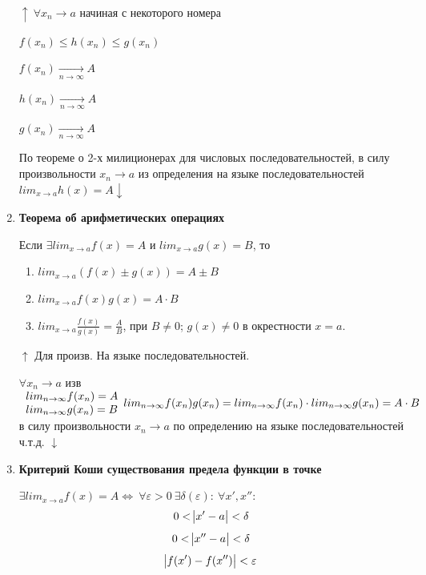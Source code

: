 \documentclass{article}
\begin{document}
\begin{enumerate}
    \(\uparrow\ \forall x_n \rightarrow a\) начиная с некоторого номера
    
    \( f(x_n) \leq h(x_n) \leq g(x_n) \)

    \( f(x_n) \xrightarrow[n \rightarrow \infty]{} A \)

    \( h(x_n) \xrightarrow[n \rightarrow \infty]{} A \)

    \( g(x_n) \xrightarrow[n \rightarrow \infty]{} A \)

    По теореме о 2-х милиционерах для числовых последовательностей, в силу произвольности \(x_n \rightarrow a\) из определения на языке последовательностей \(lim_{x \rightarrow a} h(x) = A \downarrow\)
    
    \item \textbf{Теорема об арифметических операциях}

      Если \(\exists lim_{x \rightarrow a} f(x)=A\) и \(lim_{x\rightarrow a} g(x) = B\), то
      \begin{enumerate}
        \item \(lim_{x \rightarrow a}(f(x)\pm g(x))=A\pm B\)
        \item \(lim_{x \rightarrow a} f(x)g(x) = A \cdot B\)
        \item \(lim_{x \rightarrow a} \frac{f(x)}{g(x)} = \frac{A}{B}\), при \(B \neq 0\); \(g(x) \neq 0\) в окрестности \(x=a\).
      \end{enumerate}

      \(\uparrow\) Для произв. На языке последовательностей.

      \(\forall x_n \rightarrow a\) изв \(\begin{array}{l} lim_{n \rightarrow \infty} f(x_n) = A\\ lim_{n \rightarrow \infty} g(x_n) = B\end{array}\\ 
      lim_{n \rightarrow \infty} f(x_n)g(x_n)=lim_{n \rightarrow \infty} f(x_n) \cdot lim_{n \rightarrow \infty} g(x_n)=A \cdot B\)\\
      в силу произвольности \(x_n \rightarrow a\) по определению на языке последовательностей ч.т.д. \(\downarrow\)
  
      \item \textbf{Критерий Коши существования предела функции в точке}
      
      \( \exists lim_{x \rightarrow a} f(x) = A \Leftrightarrow\ \forall \varepsilon > 0\ \exists \delta(\varepsilon):\ \forall x',x'': \)
      \[ 0 < \abs{x' - a} < \delta \]
      \[ 0 < \abs{x'' - a} < \delta \]
      \[ \abs{f(x') - f(x'')} < \varepsilon \]
      

\end{enumerate}
\end{document}
